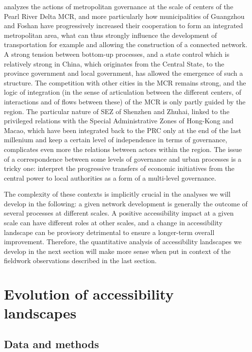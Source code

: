 \cite{Ye2014200} analyzes the actions of metropolitan governance at the scale of centers of the Pearl River Delta MCR, and more particularly how municipalities of Guangzhou and Foshan have progressively increased their cooperation to form an integrated metropolitan area, what can thus strongly influence the development of transportation for example and allowing the construction of a connected network. A strong tension between bottom-up processes, and a state control which is relatively strong in China, which originates from the Central State, to the province government and local government, has allowed the emergence of such a structure. The competition with other cities in the MCR remains strong, and the logic of integration (in the sense of articulation between the different centers, of interactions and of flows between these) of the MCR is only partly guided by the region. The particular nature of SEZ of Shenzhen and Zhuhai, linked to the privileged relations with the Special Administrative Zones of Hong-Kong and Macao, which have been integrated back to the PRC only at the end of the last millenium and keep a certain level of independence in terms of governance, complicates even more the relations between actors within the region. The issue of a correspondence between some levels of governance and urban processes is a tricky one: \cite{liao2017ouverture} interpret the progressive transfers of economic initiatives from the central power to local authorities as a form of a multi-level governance.


The complexity of these contexts is implicitly crucial in the analyses we will develop in the following: a given network development is generally the outcome of several processes at different scales. A positive accessibility impact at a given scale can have different roles at other scales, and a change in accessibility landscape can be provisory detrimental to ensure a longer-term overall improvement. Therefore, the quantitative analysis of accessibility landscapes we develop in the next section will make more sense when put in context of the fieldwork observations described in the last section.



\section{Evolution of accessibility landscapes}


\subsection{Data and methods}

